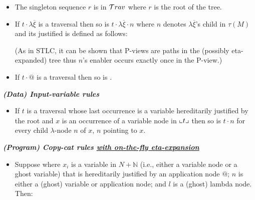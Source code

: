 \documentclass{article}
\theoremstyle{definition}
\newcommand\Nodes{N}%
\begin{document}
\begin{FramedTable}
\begin{itemize}[]
\item{} The singleton sequence $r$ is in $\mathcal{T}rav$ where $r$ is the root of the tree.
\end{itemize}

\begin{itemize}[]
    \item {} If $t \cdot \lambda \overline{\xi}$ is a traversal then so is
        $t \cdot \lambda \overline{\xi} \cdot n$ where $n$
        denotes $\lambda \overline{\xi}$'s child in $\tau(M)$ and its justified is defined as follows:
            (As in STLC, it can be shown that P-views  are paths in the (possibly eta-expanded) tree thus $n$'s enabler occurs exactly once in the P-view.)
    \item {} If $t \cdot @$ is a traversal then so is .
\end{itemize}

\emph{\bf (Data) Input-variable rules}

\begin{itemize}[]
\item {} If $t$ is a traversal whose last occurrence is a variable hereditarily justified by the root and $x$ is an occurrence of a variable node in $\llcorner t \lrcorner$ then
so is $t \cdot n$ for every child $\lambda$-node $n$ of $x$, $n$
pointing to $x$.
\end{itemize}

\emph{\bf (Program) Copy-cat rules \underline{with on-the-fly eta-expansion}}
\begin{itemize}[]
\item{}
Suppose  where $x_i$ is a variable in $\Nodes + \mathbb{N}$ (i.e., either a variable node or a ghost variable) that is hereditarily justified by an application node $@$; $n$ is either a (ghost) variable or application node; and $l$ is a (ghost) lambda node. Then:


\end{itemize}
\end{FramedTable}
\end{document}

